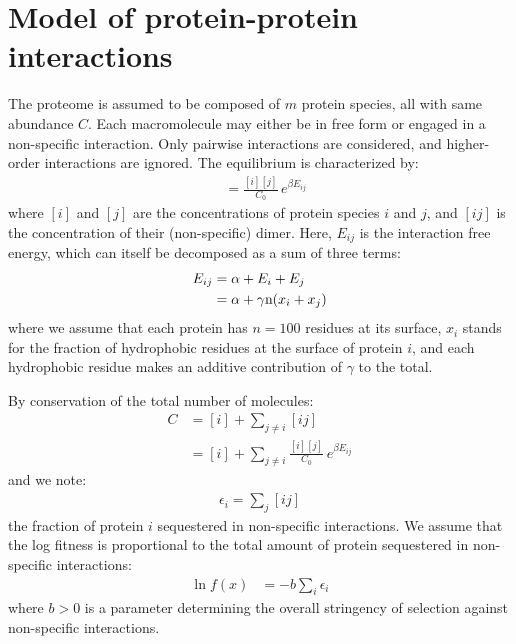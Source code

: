 \section{Model of protein-protein interactions}
The proteome is assumed to be composed of $m$ protein species, all with same abundance $C$. Each macromolecule may either be in free form or engaged in a non-specific interaction. Only pairwise interactions are considered, and higher-order interactions are ignored.
The equilibrium is characterized by:
\begin{align}
[ij] & = \frac{[i][j]}{C_0} \, e^{\beta E_{ij}}
\end{align}
where $[i]$ and $[j]$ are the concentrations of protein species $i$ and $j$, and $[ij]$ is the concentration of their (non-specific) dimer. Here, $E_{ij}$ is the interaction free energy, which can itself be decomposed as a sum of three terms:
\begin{align}
E_{ij} & = \alpha + E_i + E_j 
\\
& = \alpha + \gamma \text{n} (x_i + x_j)
\end{align}
where we assume that each protein has $n=100$ residues at its surface, $x_i$ stands for the fraction of hydrophobic residues at the surface of protein $i$, and each hydrophobic residue makes an additive contribution of $\gamma$ to the total.

By conservation of the total number of molecules:
\begin{align}
C & = [i] + \sum\limits_{j \neq i} [ij] \\
& = [i] + \sum\limits_{j \neq i} \frac{[i][j]}{C_0} \, e^{\beta E_{ij}}
\end{align}
and we note:
\begin{align}
\epsilon_i = \sum_j [ij]
\end{align}
the fraction of protein $i$ sequestered in non-specific interactions.
We assume that the log fitness is proportional to the total amount of protein sequestered in non-specific interactions:
\begin{align}
\ln f(x) & = -b \sum_i \epsilon_i
\end{align}
where $b>0$ is a parameter determining the overall stringency of selection against non-specific interactions.
